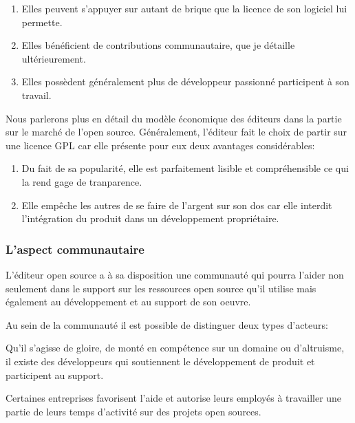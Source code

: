 				\begin{enumerate}[font=\color{burntorange}]
		 			\item Elles peuvent s'appuyer sur autant de brique que la licence de son logiciel lui permette.
		 			\item Elles bénéficient de contributions communautaire, que je détaille ultérieurement.
			 		\item Elles possèdent généralement plus de développeur passionné participent à son travail.
				\end{enumerate}

				Nous parlerons plus en détail du modèle économique des éditeurs dans la partie sur le marché de l'open source.
				Généralement, l'éditeur fait le choix de partir sur une licence GPL car elle présente pour eux deux avantages considérables:


				\begin{enumerate}[font=\color{burntorange}]
		 			\item Du fait de sa popularité, elle est parfaitement lisible et compréhensible ce qui la rend gage de tranparence.
		 			\item Elle empêche les autres de se faire de l'argent sur son dos car elle interdit l'intégration du produit dans un développement propriétaire.
				\end{enumerate}

			\subsubsection{L'aspect communautaire}

				L'éditeur open source a à sa disposition une communauté qui pourra l'aider non seulement dans le support sur les ressources open source qu'il utilise mais également au développement et au support de son oeuvre.

				Au sein de la communauté il est possible de distinguer deux types d'acteurs:

				\begin{description}[font=\color{burntorange}]
					\item[les développeurs indépendants: ] Qu'il s'agisse de gloire, de monté en compétence sur un domaine ou d'altruisme, il existe des développeurs qui soutiennent le développement de produit et participent au support.
					\item[Les contributeurs et entreprises contributrices: ] Certaines entreprises favorisent l'aide et autorise leurs employés à travailler une partie de leurs temps d'activité sur des projets open sources.
				\end{description}

